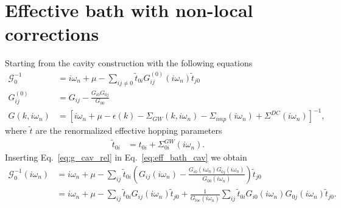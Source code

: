 \documentclass[12pt,a4paper]{scrartcl}
\numberwithin{equation}{section}
\begin{document}
\section{Effective bath with non-local corrections}
Starting from the cavity construction with the following
equations
\begin{align}
 \mathcal{G}_0^{-1}
 &= i\omega_n + \mu - \sum_{ij\neq 0} \tilde{t}_{0i} G^{(0)}_{ij}(i\omega_n) \tilde{t}_{j0} \label{eq:eff_bath_cav}\\
 G^{(0)}_{ij}
 &= G_{ij} - \frac{ G_{i0}G_{0j} }{ G_{00} } \label{eq:g_cav_rel} \\
 G(k,i\omega_n)
 &= \left[ i\omega_n + \mu - \epsilon(k) - \Sigma_{GW}(k,i\omega_n)
    -\Sigma_{imp}(i\omega_n) + \Sigma^{DC}(i\omega_n)\right]^{-1},
\end{align}
where $\tilde{t}$ are the renormalized effective hopping parameters
\begin{align}
 \tilde{t}_{0i} &= t_{0i} + \Sigma^{GW}_{0i}(i\omega_n) . 
\end{align}
Inserting Eq.~\eqref{eq:g_cav_rel} in Eq.~\eqref{eq:eff_bath_cav} we obtain
\begin{align}
 \mathcal{G}_0^{-1}(i\omega_n)
 &= i\omega_n + \mu - \sum_{ij} \tilde{t}_{0i} 
 \left( G_{ij}(i\omega_n) - \frac{ G_{i0}(i\omega_n)G_{0j}(i\omega_n) }{ G_{00}(i\omega_n) } \right) \tilde{t}_{j0} \\
&= i\omega_n + \mu - \sum_{ij} \tilde{t}_{0i} G_{ij}(i\omega_n)\tilde{t}_{j0}
   + \frac{1}{G_{loc}(i\omega_n)} \sum_{ij} \tilde{t}_{0i} G_{i0}(i\omega_n)G_{0j}(i\omega_n) \tilde{t}_{j0} .
 \end{align}
\end{document}
